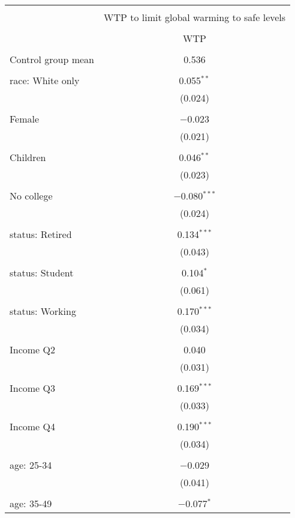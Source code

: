 
\begin{tabular}{@{\extracolsep{5pt}}lc} 
\\[-1.8ex]\hline 
\hline \\[-1.8ex] 
 & \multicolumn{1}{c}{WTP to limit global warming to safe levels} \\ 
\cline{2-2} 
\\[-1.8ex] & WTP \\ 
\hline \\[-1.8ex] 
 Control group mean & 0.536  \\ \hline \\[-1.8ex] race: White only & 0.055$^{**}$ \\ 
  & (0.024) \\ 
  & \\ 
 Female & $-$0.023 \\ 
  & (0.021) \\ 
  & \\ 
 Children & 0.046$^{**}$ \\ 
  & (0.023) \\ 
  & \\ 
 No college & $-$0.080$^{***}$ \\ 
  & (0.024) \\ 
  & \\ 
 status: Retired & 0.134$^{***}$ \\ 
  & (0.043) \\ 
  & \\ 
 status: Student & 0.104$^{*}$ \\ 
  & (0.061) \\ 
  & \\ 
 status: Working & 0.170$^{***}$ \\ 
  & (0.034) \\ 
  & \\ 
 Income Q2 & 0.040 \\ 
  & (0.031) \\ 
  & \\ 
 Income Q3 & 0.169$^{***}$ \\ 
  & (0.033) \\ 
  & \\ 
 Income Q4 & 0.190$^{***}$ \\ 
  & (0.034) \\ 
  & \\ 
 age: 25-34 & $-$0.029 \\ 
  & (0.041) \\ 
  & \\ 
 age: 35-49 & $-$0.077$^{*}$ \\ 

\end{tabular}
